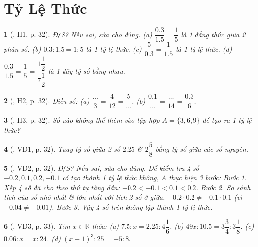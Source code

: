 \documentclass{article}
\newtheorem{baitoan}{}
\begin{document}

\section{Tỷ Lệ Thức}

\begin{baitoan}[\cite{Binh_boi_duong_Toan_7_tap_1}, H1, p. 32]
	{\rm Đ{\tt/}S?} Nếu sai, sửa cho đúng. (a) $\dfrac{0.3}{1.5} = \dfrac{1}{5}$ là 1 đẳng thức giữa 2 phân số. (b) $0.3:1.5 = 1:5$ là 1 tỷ lệ thức. (c) $\dfrac{5}{0.3} = \dfrac{1}{1.5}$ là 1 tỷ lệ thức. (d) $\dfrac{0.3}{1.5} = \dfrac{1}{5} = \dfrac{1\dfrac{1}{2}}{7\dfrac{1}{2}}$ là 1 dãy tỷ số bằng nhau.
\end{baitoan}

\begin{baitoan}[\cite{Binh_boi_duong_Toan_7_tap_1}, H2, p. 32]
	Điền số: (a) $\dfrac{\ldots}{3} = \dfrac{4}{12} = \dfrac{5}{\ldots}$. (b) $\dfrac{0.1}{\ldots} = \dfrac{\ldots}{14} = \dfrac{0.3}{6}$.
\end{baitoan}

\begin{baitoan}[\cite{Binh_boi_duong_Toan_7_tap_1}, H3, p. 32]
	Số nào không thể thêm vào tập hợp $A = \{3,6,9\}$ để tạo ra 1 tỷ lệ thức?
\end{baitoan}

\begin{baitoan}[\cite{Binh_boi_duong_Toan_7_tap_1}, VD1, p. 32]
	Thay tỷ số giữa 2 số $2.25$ \& $2\dfrac{5}{8}$ bằng tỷ số giữa các số nguyên.
\end{baitoan}

\begin{baitoan}[\cite{Binh_boi_duong_Toan_7_tap_1}, VD2, p. 32]
	{\rm Đ{\tt/}S?} Nếu sai, sửa cho đúng. Để kiểm tra 4 số $-0.2,0.1,0.2,-0.1$ có tạo thành 1 tỷ lệ thức không, A thực hiện 3 bước: Bước 1. Xếp 4 số đã cho theo thứ tự tăng dần: $-0.2 < -0.1 < 0.1 < 0.2$. Bước 2. So sánh tích của số nhỏ nhất \& lớn nhất với tích 2 số ở giữa. $-0.2\cdot0.2\ne-0.1\cdot0.1$ (vì $-0.04\ne-0.01$). Bước 3. Vậy 4 số trên không lập thành 1 tỷ lệ thức.
\end{baitoan}

\begin{baitoan}[\cite{Binh_boi_duong_Toan_7_tap_1}, VD3, p. 33]
	Tìm $x\in\mathbb{R}$ thỏa: (a) $7.5:x = 2.25:4\dfrac{1}{6}$. (b) $49x:10.5 = 3\dfrac{3}{4}:3\dfrac{1}{8}$. (c) $0.06:x = x:24$. (d) $(x - 1)^3:25 = -5:8$.
\end{baitoan}
\end{document}
